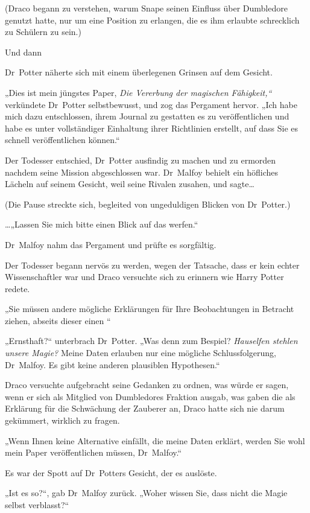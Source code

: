 {(Draco begann zu verstehen, warum Snape seinen Einfluss über Dumbledore genutzt hatte, nur um eine Position zu erlangen, die es ihm erlaubte schrecklich zu Schülern zu sein.)

Und dann \later

Dr~Potter näherte sich mit einem überlegenen Grinsen auf dem Gesicht.

„Dies ist mein jüngstes Paper, \emph{Die Vererbung der magischen Fähigkeit,“} verkündete Dr~Potter selbstbewusst, und zog das Pergament hervor. „Ich habe mich dazu entschlossen, ihrem Journal zu gestatten es zu veröffentlichen und habe es unter vollständiger Einhaltung ihrer Richtlinien erstellt, auf dass Sie es schnell veröffentlichen können.“

Der Todesser entschied, Dr~Potter ausfindig zu machen und zu ermorden nachdem seine Mission abgeschlossen war. Dr~Malfoy behielt ein höfliches Lächeln auf seinem Gesicht, weil seine Rivalen zusahen, und sagte…

(Die Pause streckte sich, begleited von ungeduldigen Blicken von Dr~Potter.)

…„Lassen Sie mich bitte einen Blick auf das werfen.“

Dr~Malfoy nahm das Pergament und prüfte es sorgfältig.

Der Todesser begann nervös zu werden, wegen der Tatsache, dass er kein echter Wissenschaftler war und Draco versuchte sich zu erinnern wie Harry Potter redete.

„Sie müssen andere mögliche Erklärungen für Ihre Beobachtungen in Betracht ziehen, abseits dieser einen \later“

„Ernsthaft?“ unterbrach Dr~Potter. „Was denn zum Bespiel? \emph{Hauselfen stehlen unsere Magie?} Meine Daten erlauben nur eine mögliche Schlussfolgerung, Dr~Malfoy. Es gibt keine anderen plausiblen Hypothesen.“

Draco versuchte aufgebracht seine Gedanken zu ordnen, was würde er sagen, wenn er sich als Mitglied von Dumbledores Fraktion ausgab, was gaben die als Erklärung für die Schwächung der Zauberer an, Draco hatte sich nie darum gekümmert, wirklich zu fragen.

„Wenn Ihnen keine Alternative einfällt, die meine Daten erklärt, werden Sie wohl mein Paper veröffentlichen müssen, Dr~Malfoy.“

Es war der Spott auf Dr~Potters Gesicht, der es auslöste.

„Ist es so?“, gab Dr~Malfoy zurück. „Woher wissen Sie, dass nicht die Magie selbst verblasst?“

}
